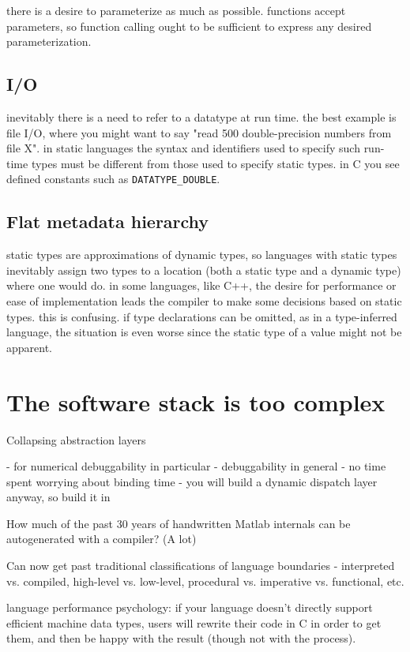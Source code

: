 {there is a desire to parameterize as much as possible. functions
accept parameters, so function calling ought to be sufficient to express
any desired parameterization.


\subsection{I/O}

inevitably there is a need to refer to a datatype at run time. the best
example is file I/O, where you might want to say "read 500 double-precision
numbers from file X". in static languages the syntax and identifiers used
to specify such run-time types must be different from those used to specify
static types. in C you see defined constants such as \texttt{DATATYPE\_DOUBLE}.


\subsection{Flat metadata hierarchy}

static types are approximations of dynamic types, so languages with static
types inevitably assign two types to a location (both a static type and a
dynamic type) where one would do. in some languages, like C++, the desire
for performance or ease of implementation leads the compiler to make some
decisions based on static types. this is confusing. if type declarations
can be omitted, as in a type-inferred language, the situation is even worse
since the static type of a value might not be apparent.



\section{The software stack is too complex}

Collapsing abstraction layers

- for numerical debuggability in particular
- debuggability in general
- no time spent worrying about binding time
- you will build a dynamic dispatch layer anyway, so build it in


How much of the past 30 years of handwritten Matlab internals can
be autogenerated with a compiler? (A lot)

Can now get past traditional classifications of language boundaries
- interpreted vs. compiled, high-level vs. low-level, procedural vs.
imperative vs. functional, etc.

language performance psychology:
if your language doesn't directly support efficient machine data types,
users will rewrite their code in C in order to get them, and then be
happy with the result (though not with the process).

}
